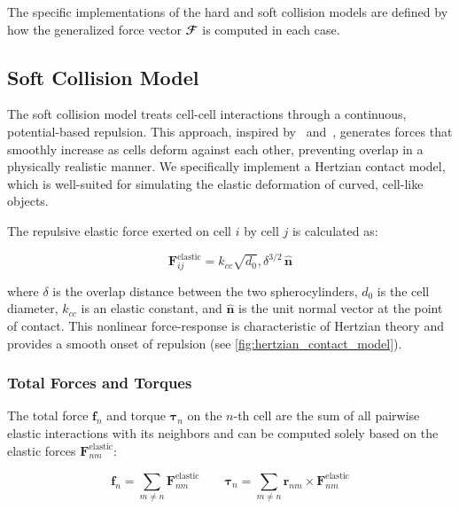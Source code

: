 \documentclass[conference]{IEEEtran}
\begin{document}
The specific implementations of the hard and soft collision models are defined by how the generalized force vector $\mathbfcal{F}$ is computed in each case.

\newpage

\subsection{Soft Collision Model}

The soft collision model treats cell-cell interactions through a continuous, potential-based repulsion. This approach, inspired by~\cite{Warren2019} and~\cite{You2018}, generates forces that smoothly increase as cells deform against each other, preventing overlap in a physically realistic manner. We specifically implement a Hertzian contact model, which is well-suited for simulating the elastic deformation of curved, cell-like objects.

The repulsive elastic force exerted on cell $i$ by cell $j$ is calculated as:

\begin{equation} \label{eq:hertzian_contact_model}
    \mathbf{F}^{\text{elastic}}_{ij} = k_{cc} \sqrt{d_0} , \delta^{3/2} \, \hat{\mathbf{n}}
\end{equation}

where $\delta$ is the overlap distance between the two spherocylinders, $d_0$ is the cell diameter, $k_{cc}$ is an elastic constant, and $\hat{\mathbf{n}}$ is the unit normal vector at the point of contact. This nonlinear force-response is characteristic of Hertzian theory and provides a smooth onset of repulsion (see \autoref{fig:hertzian_contact_model}).

\subsubsection{Total Forces and Torques}

The total force $\mathbf{f}_n$ and torque $\boldsymbol{\tau}_n$ on the $n$-th cell are the sum of all pairwise elastic interactions with its neighbors and can be computed solely based on the elastic forces $\mathbf{F}^{\text{elastic}}_{nm}$:

\begin{equation}
    \mathbf{f}_n         = \sum_{m \neq n} \mathbf{F}^{\text{elastic}}_{nm} \qquad
    \boldsymbol{\tau}_n  = \sum_{m \neq n} \mathbf{r}_{nm} \times \mathbf{F}^{\text{elastic}}_{nm}
\end{equation}
\end{document}
